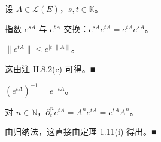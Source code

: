 \begin{remark}

设 $ A \in \mathcal{L}(E) $，$ s, t \in \mathbb{K} $。

\begin{items}
\item

指数 $ e^{sA} $ 与 $ e^{tA} $ 交换：$ e^{sA}e^{tA} = e^{tA}e^{sA} $。

\item

$ \|e^{tA}\| \le e^{|t|\|A\|} $。

\proofhead
这由注 II.8.2(c) 可得。\nobreak\hspace{0.35em}■
\item

$ (e^{tA})^{-1} = e^{-tA} $。

\item

对 $ n \in \mathbb{N} $，$ \partial_{t}^{n}e^{tA} = A^{n}e^{tA} = e^{tA}A^{n} $。

\proofhead
由归纳法，这直接由定理 1.11(i) 得出。\nobreak\hspace{0.35em}■
\end{items}

\end{remark}

